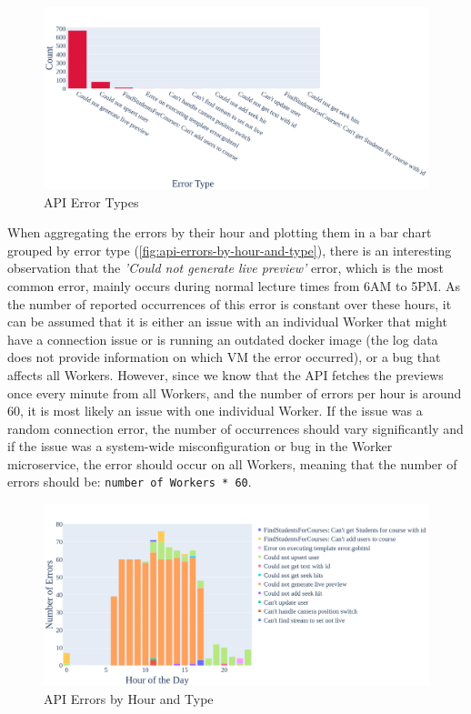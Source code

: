 \begin{figure}[htpb]
    \centering
    \includegraphics[width=\linewidth]{images/plots/api/error_types.png}
    \caption[\ac{API} Error Types]{\ac{API} Error Types}\label{fig:api-error-types}
\end{figure}
\break

\noindent When aggregating the errors by their hour and plotting them in a bar chart grouped by error type (\autoref{fig:api-errors-by-hour-and-type}), there is an interesting observation that the \textit{'Could not generate live preview'} error, which is the most common error, mainly occurs during normal lecture times from 6AM to 5PM. As the number of reported occurrences of this error is constant over these hours, it can be assumed that it is either an issue with an individual Worker that might have a connection issue or is running an outdated docker image (the log data does not provide information on which \ac{VM} the error occurred), or a bug that affects all Workers. However, since we know that the \ac{API} fetches the previews once every minute from all Workers, and the number of errors per hour is around 60, it is most likely an issue with one individual Worker. If the issue was a random connection error, the number of occurrences should vary significantly and if the issue was a system-wide misconfiguration or bug in the Worker microservice, the error should occur on all Workers, meaning that the number of errors should be: \texttt{number of Workers * 60}.     

\begin{figure}[htpb]
    \centering
    \includegraphics[width=\linewidth]{images/plots/api/errors_by_hour_and_type.png}
    \caption[\ac{API} Errors by Hour and Type]{\ac{API} Errors by Hour and Type}\label{fig:api-errors-by-hour-and-type}
\end{figure}

